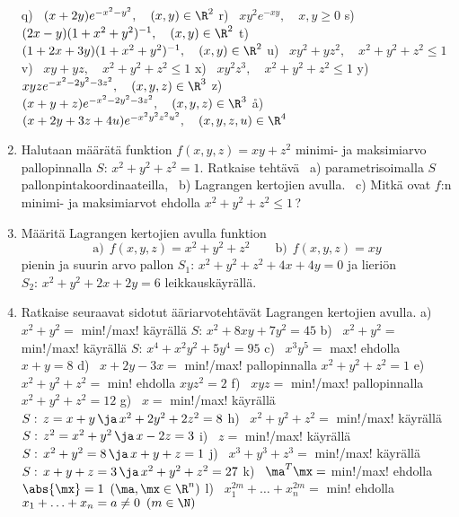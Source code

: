 \begin{enumerate}
q) \ $(x+2y)e^{-x^2-y^2}, \quad (x,y)\in\R^2$ \newline
r) \ $xy^2e^{-xy}, \quad x,y \ge 0$ \newline
s) \ $(2x-y)(1+x^2+y^2)^ {-1}, \quad (x,y)\in\R^2$ \newline
t) \ $(1+2x+3y)(1+x^2+y^2)^{-1}, \quad (x,y)\in\R^2$ \newline
u) \ $xy^2+yz^2, \quad x^2+y^2+z^2 \le 1$ \newline
v) \ $xy+yz, \quad x^2+y^2+z^2 \le 1$ \newline
x) \ $xy^2z^3, \quad x^2+y^2+z^2 \le 1$ \newline
y) \ $xyze^{-x^2-2y^2-3z^2}, \quad (x,y,z)\in\R^3$ \newline
z) \ $(x+y+z)e^{-x^2-2y^2-3z^2}, \quad (x,y,z)\in\R^3$ \newline
å) \ $(x+2y+3z+4u)e^{-x^2y^2z^2u^2}, \quad (x,y,z,u)\in\R^4$

\item
Halutaan määrätä funktion $f(x,y,z)=xy+z^2$ minimi- ja maksimiarvo pallopinnalla
$S:\,x^2+y^2+z^2=1$. Ratkaise tehtävä \ a) parametrisoimalla $S$ pallonpintakoordinaateilla, \
b) Lagrangen kertojien avulla. \ c) Mitkä ovat $f$:n minimi- ja maksimiarvot ehdolla
$x^2+y^2+z^2 \le 1$\,?

\item
Määritä Lagrangen kertojien avulla funktion
\[
\text{a)}\ \ f(x,y,z)=x^2+y^2+z^2 \qquad \text{b)}\ \ f(x,y,z)=xy
\]
pienin ja suurin arvo pallon $S_1:\,x^2+y^2+z^2+4x+4y=0$ ja lieriön $S_2:\, x^2+y^2+2x+2y=6$ 
leikkauskäyrällä.

\item
Ratkaise seuraavat sidotut ääriarvotehtävät Lagrangen kertojien avulla. \vspace{1mm}\newline
a) \ $x^2+y^2=$ min!/max! käyrällä $S:\,x^2+8xy+7y^2=45$ \newline
b) \ $x^2+y^2=$ min!/max! käyrällä $S:\,x^4+x^2y^2+5y^4=95$ \newline
c) \ $x^3y^5=$ max! ehdolla $x+y=8$ \newline
d) \ $x+2y-3x=$ min!/max! pallopinnalla $x^2+y^2+z^2=1$ \newline
e) \ $x^2+y^2+z^2=$ min! ehdolla $xyz^2=2$ \newline
f) \ $xyz=$ min!/max! pallopinnalla $x^2+y^2+z^2=12$ \newline
g) \ $x=$ min!/max! käyrällä $S:\,z=x+y\,\ja\,x^2+2y^2+2z^2=8$ \newline
h) \ $x^2+y^2+z^2=$ min!/max! käyrällä $S:\,z^2=x^2+y^2\,\ja\,x-2z=3$ \newline
i) \ $z=$ min!/max! käyrällä $S:\,x^2+y^2=8\,\ja\,x+y+z=1$ \newline
j) \ $x^3+y^3+z^3=$ min!/max! käyrällä $S:\,x+y+z=3\,\ja\,x^2+y^2+z^2=27$ \newline
k) \ $\ma^T\mx=$ min!/max! ehdolla $\abs{\mx}=1\,\ (\ma,\mx\in\R^n)$ \newline
l) \ $x_1^{2m} + \ldots + x_n^{2m}=$ min! ehdolla $x_1 + \ldots + x_n=a \neq 0\,\ (m\in\N)$


\end{enumerate}
